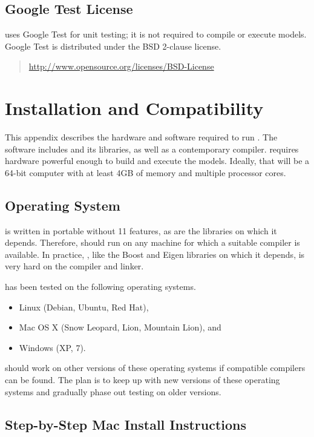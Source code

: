 \section{Google Test License}

\Stan uses Google Test for unit testing; it is not required to compile
or execute models.  Google Test is distributed under the BSD 2-clause
license.
%
\begin{quote}
\url{http://www.opensource.org/licenses/BSD-License}
\end{quote}


\chapter{Installation and Compatibility}\label{install.appendix}

\noindent
This appendix describes the hardware and software required to run
\Stan.  The software includes \Stan and its libraries, as well as a
contemporary \Cpp compiler.  \Stan requires hardware powerful enough
to build and execute the models.  Ideally, that will be a 64-bit
computer with at least 4GB of memory and multiple processor cores.

\section{Operating System}

\Stan is written in portable \Cpp without {\Cpp}11 features, as are the
libraries on which it depends.  Therefore, \Stan should run on any machine
for which a suitable \Cpp compiler is available.  In practice, \Stan,
like the Boost and Eigen libraries on which it depends, is very hard
on the compiler and linker.

\Stan has been tested on the following operating systems.
%
\begin{itemize}
\item Linux (Debian, Ubuntu, Red Hat), 
\item Mac OS X (Snow Leopard, Lion, Mountain Lion), and
\item Windows (XP, 7).
\end{itemize}
%
\Stan should work on other versions of these operating systems if
compatible \Cpp compilers can be found.  The plan is to keep up with
new versions of these operating systems and gradually phase out
testing on older versions.



\section{Step-by-Step Mac Install Instructions}

